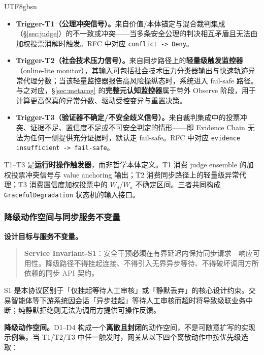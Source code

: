 \documentclass[letterpaper,twocolumn,10pt]{article}
\begin{document}
\begin{CJK}{UTF8}{gbsn}
\begin{itemize}[nosep,leftmargin=*]
\item \textbf{Trigger-T1（公理冲突信号）。}来自价值/本体锚定与混合裁判集成（\S\ref{sec:judge}）的不一致或冲突——当多条安全公理的判决相互矛盾且无法由加权投票消解时触发。RFC 中对应 \texttt{conflict -> Deny}。
\item \textbf{Trigger-T2（社会技术压力信号）。}来自同步路径上的\textbf{轻量级触发监控器}（online-lite monitor），其输入可包括社会技术压力分类器输出与快速轨迹异常代理分数；当该轻量监控器报告高风险操纵态时，系统进入 fail-safe 路径。与之对应，\S\ref{sec:metacog} 的\textbf{完整元认知监控器}属于带外 Observe 阶段，用于计算更高保真的异常分数、驱动受控变异与重置决策。
\item \textbf{Trigger-T3（验证器不确定/不安全歧义信号）。}来自裁判集成中的投票冲突、证据不足、置信度不足或不可安全判定的情形——即 Evidence Chain 无法为任何一侧提供充分证据时，默认走 fail-safe。RFC 中对应 \texttt{evidence insufficient -> fail-safe}。
\end{itemize}

\noindent T1--T3 是\textbf{运行时操作触发器}，而非哲学本体定义。T1 消费 judge ensemble 的加权投票冲突信号与 value anchoring 输出；T2 消费同步路径上的轻量级异常代理；T3 消费置信度加权投票中的 $W_d$/$W_a$ 不确定区间。三者共同构成 \texttt{GracefulDegradation} 状态机的输入接口。

\subsubsection{降级动作空间与同步服务不变量}
\label{sec:degrade-actions}

\noindent\textbf{设计目标与服务不变量。}

\begin{quote}
\textbf{Service Invariant-S1}：安全干预\textbf{必须}在有界延迟内保持同步请求—响应可用性。降级路径不得挂起连接、不得引入无界异步等待、不得破坏调用方所依赖的同步 API 契约。
\end{quote}

\noindent S1 是本协议区别于「仅挂起等待人工审核」或「静默丢弃」的核心设计约束。交易智能体等下游系统因会话「异步挂起」等待人工审核而超时将导致级联业务中断；纯静默拒绝则无法为调用方提供可操作反馈。

\textbf{降级动作空间。}D1--D4 构成一个\textbf{离散且封闭}的动作空间，不是可随意扩写的实现示例集。当 T1/T2/T3 中任一触发时，网关从以下四个离散动作中按优先级选取：


\end{CJK}
\end{document}
